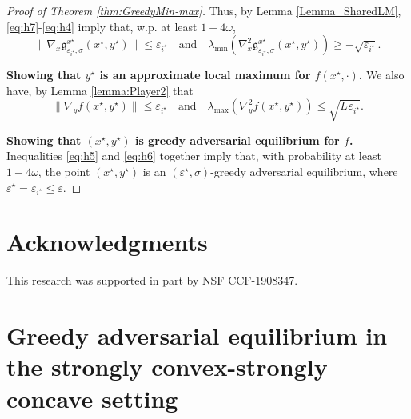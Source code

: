 \documentclass[11pt,letterpaper]{article}
\renewcommand{\epsilon}{\varepsilon}
\newcommand{\eps}{\varepsilon}
\newcommand{\ai}{i}
\begin{document}
\begin{proof}[Proof of Theorem \ref{thm:GreedyMin-max}]
 
\noindent Thus, by Lemma \ref{Lemma_SharedLM},  \, \eqref{eq:h7}-\eqref{eq:h4} imply that, w.p. at least $1-4 \omega$,
%
 \begin{equation} \label{eq:h5}
\big\|\nabla_{{x}} \mathfrak{g}_{\epsilon_{\ai^\star}, \sigma}^{x^\star}(x^\star, y^\star)\big\| \leq \epsilon_{\ai^\star} \quad \textrm{and} \quad \lambda_{\mathrm{min}}(\nabla^2_{{x}} \mathfrak{g}_{\epsilon_{\ai^\star}, \sigma}^{x^\star}(x^\star, y^\star)) \geq - \sqrt{\epsilon_{\ai^\star}}.
\end{equation}


\noindent \textbf{Showing that $y^\star$ is an approximate local maximum for $f(x^\star, \cdot)$.}
%
We also have, by Lemma \ref{lemma:Player2} that
%
\begin{equation} \label{eq:h6}
\|\nabla_y f(x^\star, y^\star)\| \leq  \epsilon_{\ai^\star} \, \, \, \,  \textrm{ and }  \, \,  \, \,  \lambda_{\mathrm{max}}( \nabla^2_{{y}} f(x^\star, y^\star)) \leq \sqrt{L_{}  \epsilon_{\ai^\star}}.
\end{equation}

\noindent \textbf{Showing that $(x^\star, y^\star)$ is greedy adversarial equilibrium for $f$.}
%
 Inequalities \eqref{eq:h5} and \eqref{eq:h6} together imply that, with probability at least $1-4 \omega$, the point $(x^\star, y^\star)$ is an $(\epsilon^\star, \sigma)$-greedy adversarial equilibrium, where $\epsilon^\star = \epsilon_{\ai^\star} \leq \eps$.
%
\end{proof}









\section*{Acknowledgments}
This research was supported in part by NSF CCF-1908347.






  



\newpage
\appendix



\section{Greedy adversarial equilibrium in the strongly convex-strongly concave setting} \label{sec:convex_concave}
\end{document}
